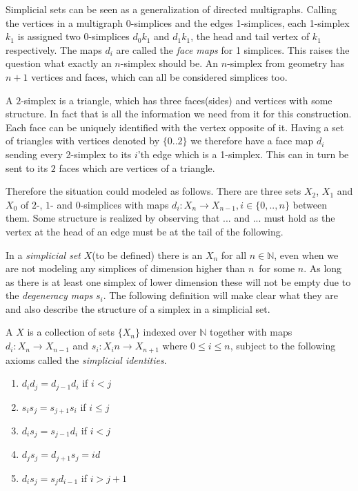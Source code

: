 \documentclass[../../main.tex]{subfiles}
\begin{document}
          
    Simplicial sets can be seen as a generalization of directed multigraphs. Calling the vertices in a multigraph 0-simplices and the edges 1-simplices, each 1-simplex $k_1$ is assigned two 0-simplices $d_0k_1$ and $d_1k_1$, the head and tail vertex of $k_1$ respectively. The maps $d_i$ are called the \emph{face maps} for 1 simplices. This raises the question what exactly an $n$-simplex should be. An $n$-simplex from geometry has $n+1$ vertices and faces, which can all be considered simplices too.

    \begin{example}[2-simplex]
        A $2$-simplex is a triangle, which has three faces(sides) and vertices with some structure. In fact that is all the information we need from it for this construction. Each face can be uniquely identified with the vertex opposite of it. Having a set of triangles with vertices denoted by $\{0..2\}$ we therefore have a face map $d_i$ sending every 2-simplex to its $i$'th edge which is a 1-simplex. This can in turn be sent to its $2$ faces which are vertices of a triangle. 
        
        Therefore the situation could modeled as follows. There are three sets $X_2$, $X_1$ and $X_0$ of $2$-, $1$- and $0$-simplices with maps $d_i: X_n \to X_{n-1}, i \in \{0,.., n\}$ between them. Some structure is realized by observing that $...$ and $...$ must hold as the vertex at the head of an edge must be at the tail of the following.
    \end{example}

    In a \emph{simplicial set} $X$(to be defined) there is an $X_n$ for all $n \in \mathbb{N}$, even when we are not modeling any simplices of dimension higher than $n$ for some $n$. As long as there is at least one simplex of lower dimension these will not be empty due to the \emph{degeneracy maps} $s_i$. The following definition will make clear what they are and also describe the structure of a simplex in a simplicial set.

    \begin{definition}\label{simplicial-set}
        A  $X$ is a collection of sets $\{X_n\}$ indexed over $\mathbb{N}$ together with maps $d_i: X_n \to X_{n-1}$ and $s_i: X_in\to X_{n+1}$ where $0 \leq i \leq n$, subject to the following axioms called the \emph{simplicial identities}.
        
        \begin{enumerate}
            \item $d_id_j = d_{j-1}d_i$ if $i < j$
            \item $s_is_j = s_{j+1}s_i$ if $i \leq j$
            \item $d_is_j = s_{j-1}d_i$ if $i < j$
            \item $d_js_j = d_{j+1}s_j = id$
            \item $d_is_j = s_jd_{i-1}$ if $i > j+1$
        \end{enumerate}
    \end{definition}
\end{document}
